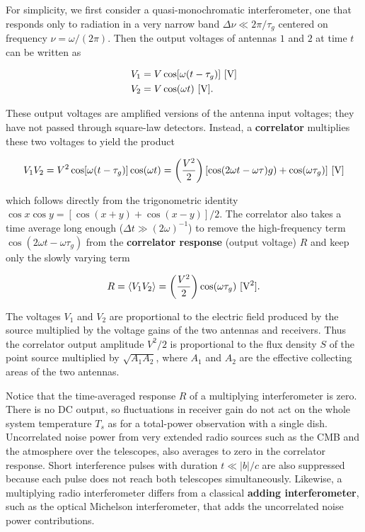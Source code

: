 \documentclass[a4paper,10pt]{article}
\begin{document}
{\noindent}For simplicity, we first consider a quasi-monochromatic interferometer, one that responds only to radiation in a very narrow band $\Delta\nu\ll2\pi/\tau_g$ centered on frequency $\nu=\omega/(2\pi)$. Then the output voltages of antennas $1$ and $2$ at time $t$ can be written as

\begin{align*}
    V_1 &= V\cos[\omega(t-\tau_g)] ~ [{\rm V}] \\
    V_2 &= V\cos(\omega t) ~ [{\rm V}].
\end{align*}

{\noindent}These output voltages are amplified versions of the antenna input voltages; they have not passed through square-law detectors. Instead, a \textbf{correlator} multiplies these two voltages to yield the product

\begin{align*}
    V_1V_2 = V^2\cos[\omega(t-\tau_g)]\cos(\omega t) = \left(\frac{V^2}{2}\right) [\cos(2\omega t-\omega \tau)g)+\cos(\omega\tau_g)] ~ [{\rm V}]
\end{align*}

{\noindent}which follows directly from the trigonometric identity $\cos x\cos y = [\cos(x+y)+\cos(x-y)]/2$. The correlator also takes a time average long enough ($\Delta t\gg(2\omega)^{-1}$) to remove the high-frequency term $\cos(2\omega t-\omega\tau_g)$ from the \textbf{correlator response} (output voltage) $R$ and keep only the slowly varying term

\begin{align*}
    R = \langle V_1V_2 \rangle = \left(\frac{V^2}{2}\right)\cos(\omega\tau_g) ~ [{\rm V^2}].
\end{align*}

{\noindent}The voltages $V_1$ and $V_2$ are proportional to the electric field produced by the source multiplied by the voltage gains of the two antennas and receivers. Thus the correlator output amplitude $V^2/2$ is proportional to the flux density $S$ of the point source multiplied by $\sqrt{A_1A_2}$, where $A_1$ and $A_2$ are the effective collecting areas of the two antennas.

{\noindent}Notice that the time-averaged response $R$ of a multiplying interferometer is zero. There is no DC output, so fluctuations in receiver gain do not act on the whole system temperature $T_s$ as for a total-power observation with a single dish. Uncorrelated noise power from very extended radio sources such as the CMB and the atmosphere over the telescopes, also averages to zero in the correlator response. Short interference pulses with duration $t\ll \lvert b\rvert/c$ are also suppressed because each pulse does not reach both telescopes simultaneously. Likewise, a multiplying radio interferometer differs from a classical \textbf{adding interferometer}, such as the optical Michelson interferometer, that adds the uncorrelated noise power contributions.
\end{document}
